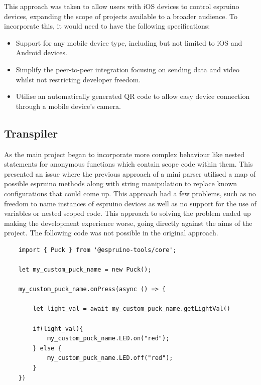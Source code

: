 \documentclass{l4proj}
\begin{document}
This approach was taken to allow users with iOS devices to control espruino devices, expanding the scope of projects available to a broader audience. To incorporate this, it would need to have the following specifications:
\\
\begin{itemize}
    \item Support for any mobile device type, including but not limited to iOS and Android devices.
    \item Simplify the peer-to-peer integration focusing on sending data and video whilst not restricting developer freedom.
    \item Utilise an automatically generated QR code to allow easy device connection through a mobile device's camera.
\end{itemize}


\subsection{Transpiler}
As the main project began to incorporate more complex behaviour like nested statements for anonymous functions which contain scope code within them. This presented an issue where the previous approach of a mini parser utilised a map of possible espruino methods along with string manipulation to replace known configurations that could come up. This approach had a few problems, such as no freedom to name instances of espruino devices as well as no support for the use of variables or nested scoped code. This approach to solving the problem ended up making the development experience worse, going directly against the aims of the project. The following code was not possible in the original approach.

\begin{lstlisting}
    import { Puck } from '@espruino-tools/core';

    let my_custom_puck_name = new Puck();
    
    my_custom_puck_name.onPress(async () => {
    
        let light_val = await my_custom_puck_name.getLightVal()
        
        if(light_val){
            my_custom_puck_name.LED.on("red");
        } else {
            my_custom_puck_name.LED.off("red");
        }
    })
\end{lstlisting}
\end{document}
